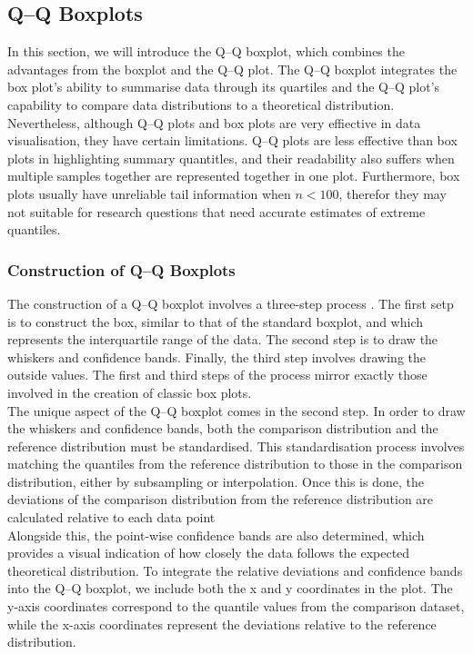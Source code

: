 \documentclass{article}\usepackage[]{graphicx}\usepackage[]{xcolor}
\numberwithin{equation}{section}
\begin{document}
\subsection{Q–Q Boxplots}
In this section, we will introduce the Q–Q boxplot, which combines the advantages from the boxplot and the Q–Q plot. The Q–Q boxplot integrates the box plot's ability to summarise data through its quartiles and the Q–Q plot's capability to compare data distributions to a theoretical distribution.\\

\noindent 
Nevertheless, although Q–Q plots and box plots are very effiective in data visualisation, they have certain limitations. Q–Q plots are less effective than box plots in highlighting summary quantitles, and their readability also suffers when multiple samples together are represented together in one plot. Furthermore, box plots usually have unreliable tail information when $n<100$, therefor they may not suitable for research questions that need accurate estimates of extreme quantiles.\\

\subsubsection{Construction of Q–Q Boxplots}
The construction of a Q–Q boxplot involves a three-step process \cite{rodu2022q}. The first setp is to construct the box, similar to that of the standard boxplot, and which represents the interquartile range of the data. The second step is to draw the whiskers and confidence bands. Finally, the third step involves drawing the outside values. The first and third steps of the process mirror exactly those involved in the creation of classic box plots.\\

\noindent
The unique aspect of the Q–Q boxplot comes in the second step. In order to draw the whiskers and confidence bands, both the comparison distribution and the reference distribution must be standardised. This standardisation process involves matching the quantiles from the reference distribution to those in the comparison distribution, either by subsampling or interpolation. Once this is done, the deviations of the comparison distribution from the reference distribution are calculated relative to each data point\\

\noindent 
Alongside this, the point-wise confidence bands are also determined, which provides a visual indication of how closely the data follows the expected theoretical distribution. To integrate the relative deviations and confidence bands into the Q–Q boxplot, we include both the x and y coordinates in the plot. The y-axis coordinates correspond to the quantile values from the comparison dataset, while the x-axis coordinates represent the deviations relative to the reference distribution.\\
\end{document}
